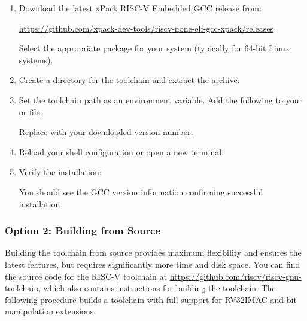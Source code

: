 \documentclass[11pt,pdftex,portrait,letterpaper]{article}
\begin{document}
\begin{enumerate}
\item Download the latest xPack RISC-V Embedded GCC release from:

\href{https://github.com/xpack-dev-tools/riscv-none-elf-gcc-xpack/releases}{https://github.com/xpack-dev-tools/riscv-none-elf-gcc-xpack/releases}

Select the appropriate package for your system (typically  for 64-bit Linux systems).

\item Create a directory for the toolchain and extract the archive:



\item Set the toolchain path as an environment variable. Add the following to your  or  file:



Replace  with your downloaded version number.

\item Reload your shell configuration or open a new terminal:


\item Verify the installation:


You should see the GCC version information confirming successful installation.
\end{enumerate}

\subsubsection{Option 2: Building from Source}

Building the toolchain from source provides maximum flexibility and ensures the latest features, but requires significantly more time and disk space. You can find the source code for the RISC-V toolchain at \href{https://github.com/riscv/riscv-gnu-toolchain}{https://github.com/riscv/riscv-gnu-toolchain}, which also contains instructions for building the toolchain. The following procedure builds a toolchain with full support for RV32IMAC and bit manipulation extensions.
\end{document}
